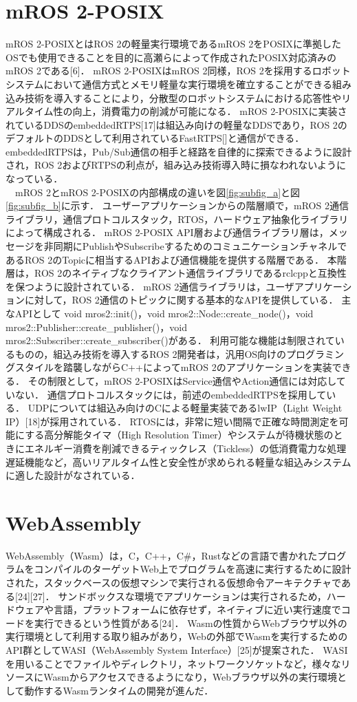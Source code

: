 \section{mROS 2-POSIX}
mROS 2-POSIXとはROS 2の軽量実行環境であるmROS 2をPOSIXに準拠したOSでも使用できることを目的に高瀬らによって作成されたPOSIX対応済みのmROS 2である[6]．
mROS 2-POSIXはmROS 2同様，ROS 2を採用するロボットシステムにおいて通信方式とメモリ軽量な実行環境を確立することができる組み込み技術を導入することにより，分散型のロボットシステムにおける応答性やリアルタイム性の向上，消費電力の削減が可能になる．
mROS 2-POSIXに実装されているDDSのembeddedRTPS[17]は組込み向けの軽量なDDSであり，ROS 2のデフォルトのDDSとして利用されているFastRTPS[]と通信ができる．
embeddedRTPSは，Pub/Sub通信の相手と経路を自律的に探索できるように設計され，ROS 2およびRTPSの利点が，組み込み技術導入時に損なわれないようになっている．
\\　mROS 2とmROS 2-POSIXの内部構成の違いを図\ref{fig:subfig_a}と図\ref{fig:subfig_b}に示す．
ユーザーアプリケーションからの階層順で，mROS 2通信ライブラリ，通信プロトコルスタック，RTOS，ハードウェア抽象化ライブラリによって構成される．
mROS 2-POSIX API層および通信ライブラリ層は，メッセージを非同期にPublishやSubscribeするためのコミュニケーションチャネルであるROS 2のTopicに相当するAPIおよび通信機能を提供する階層である．
本階層は，ROS 2のネイティブなクライアント通信ライブラリであるrclcppと互換性を保つように設計されている．
mROS 2通信ライブラリは，ユーザアプリケーションに対して，ROS 2通信のトピックに関する基本的なAPIを提供している．
主なAPIとして void mros2::init()，void mros2::Node::create\_node()，void mros2::Publisher::create\_publisher()，void mros2::Subscriber::create\_subscriber()がある．
利用可能な機能は制限されているものの，組込み技術を導入するROS 2開発者は，汎用OS向けのプログラミングスタイルを踏襲しながらC++によってmROS 2のアプリケーションを実装できる．
その制限として，mROS 2-POSIXはService通信やAction通信には対応していない．
通信プロトコルスタックには，前述のembeddedRTPSを採用している．
UDPについては組込み向けのCによる軽量実装であるlwIP（Light Weight IP）[18]が採用されている．
RTOSには，非常に短い間隔で正確な時間測定を可能にする高分解能タイマ（High Resolution Timer）やシステムが待機状態のときにエネルギー消費を削減できるティックレス（Tickless）の低消費電力な処理遅延機能など，高いリアルタイム性と安全性が求められる軽量な組込みシステムに適した設計がなされている．
\section{WebAssembly}
WebAssembly（Wasm）は，C，C++，C\#，Rustなどの言語で書かれたプログラムをコンパイルのターゲットWeb上でプログラムを高速に実行するために設計された，スタックベースの仮想マシンで実行される仮想命令アーキテクチャである[24][27]．
サンドボックスな環境でアプリケーションは実行されるため，ハードウェアや言語，プラットフォームに依存せず，ネイティブに近い実行速度でコードを実行できるという性質がある[24]．
Wasmの性質からWebブラウザ以外の実行環境として利用する取り組みがあり，Webの外部でWasmを実行するためのAPI群としてWASI（WebAssembly System Interface）[25]が提案された．
WASIを用いることでファイルやディレクトリ，ネットワークソケットなど，様々なリソースにWasmからアクセスできるようになり，Webブラウザ以外の実行環境として動作するWasmランタイムの開発が進んだ．
